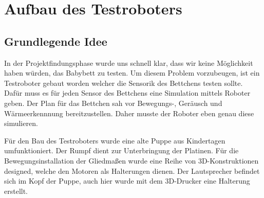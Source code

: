 \section[Aufbau des Testroboters]{Aufbau des Testroboters\authorkatrin}
\subsection{Grundlegende Idee}
In der Projektfindungsphase wurde uns schnell klar, dass wir keine Möglichkeit haben würden, das Babybett zu testen. Um diesem Problem vorzubeugen, ist ein 
Testroboter gebaut worden welcher die Sensorik des Bettchens testen sollte. Dafür muss es für jeden Sensor des Bettchens eine Simulation mittels  
Roboter geben. Der Plan für das Bettchen sah vor Bewegungs-, Geräusch und Wärmeerkennnung bereitzustellen. Daher musste der Roboter eben genau diese
simulieren. 
\par\vspace{1em}
\noindent
Für den Bau des Testroboters wurde eine alte Puppe aus Kindertagen umfunktioniert. Der Rumpf dient zur Unterbringung der Platinen. 
Für die Bewegungsinstallation der Gliedmaßen wurde eine Reihe von 3D-Konstruktionen designed, welche den Motoren als Halterungen 
dienen. Der Lautsprecher befindet sich im Kopf der Puppe, auch hier wurde mit dem 3D-Drucker eine Halterung erstellt. 


